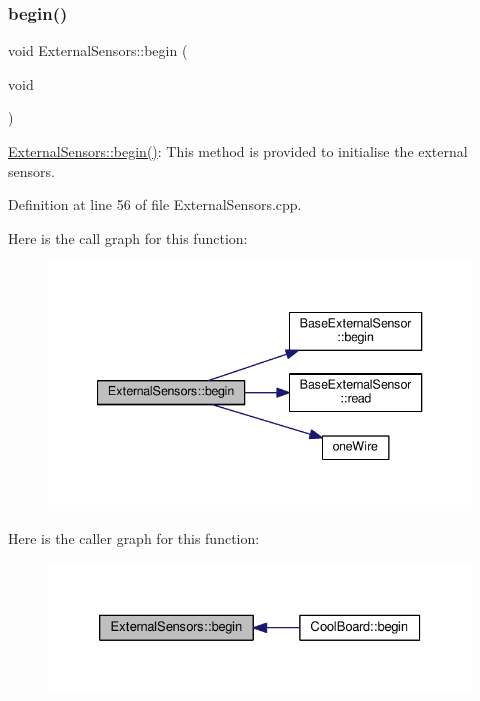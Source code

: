 \subsubsection{\texorpdfstring{begin()}{begin()}}
{\footnotesize\ttfamily void External\+Sensors\+::begin (\begin{DoxyParamCaption}\item[{void}]{ }\end{DoxyParamCaption})}

\hyperlink{class_external_sensors_a58ede0d786a86417254708870f04a21e}{External\+Sensors\+::begin()}\+: This method is provided to initialise the external sensors. 

Definition at line 56 of file External\+Sensors.\+cpp.

Here is the call graph for this function\+:
\nopagebreak
\begin{figure}[H]
\begin{center}
\leavevmode
\includegraphics[width=340pt]{class_external_sensors_a58ede0d786a86417254708870f04a21e_cgraph}
\end{center}
\end{figure}
Here is the caller graph for this function\+:
\nopagebreak
\begin{figure}[H]
\begin{center}
\leavevmode
\includegraphics[width=326pt]{class_external_sensors_a58ede0d786a86417254708870f04a21e_icgraph}
\end{center}
\end{figure}
\mbox{\label{class_external_sensors_a862a4bd11346b37270d0244c2adabe5a}} 

